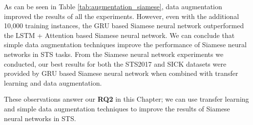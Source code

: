 \begin{table}[htb]
	\centering
	
	\caption[Results for data augmentation with Siamese Neural Networks]{Results for data augmentation with different variants of Siamese neural networks. For each data augmentation experiment, we show the difference between performing the data augmentation and without performing data augmentation. For ease of visualisation we only report the Pearson correlation ($\bm{\rho}$).} 
	\label{tab:augmentation_siamese}
	\end{table}
	
As can be seen in Table \ref{tab:augmentation_siamese}, data augmentation improved the results of all the experiments. However, even with the additional 10,000 training instances, the GRU based Siamese neural network outperformed the LSTM + Attention based Siamese neural network. We can conclude that simple data augmentation techniques improve the performance of Siamese neural networks in STS tasks. From the Siamese neural network experiments we conducted, our best results for both the STS2017 and SICK datasets were provided by GRU based Siamese neural network when combined with transfer learning and data augmentation.
	
These observations answer our \textbf{RQ2} in this Chapter; we can use transfer learning and simple data augmentation techniques to improve the results of Siamese neural networks in STS. 
	
